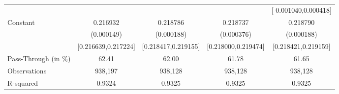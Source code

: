 {\begin{tabular}{l*{4}{c}}
                    &                     &                     &                     &[-0.001040,0.000418]         \\
Constant            &    0.216932\sym{***}&    0.218786\sym{***}&    0.218737\sym{***}&    0.218790\sym{***}\\
                    &  (0.000149)         &  (0.000188)         &  (0.000376)         &  (0.000188)         \\
                    &[0.216639,0.217224]         &[0.218417,0.219155]         &[0.218000,0.219474]         &[0.218421,0.219159]         \\
\midrule
Pass-Through (in \%)&       62.41         &       62.00         &       61.78         &       61.65         \\
Observations        &     938,197         &     938,128         &     938,128         &     938,128         \\
R-squared           &      0.9324         &      0.9325         &      0.9325         &      0.9325         \\
\bottomrule
\end{tabular}
}
